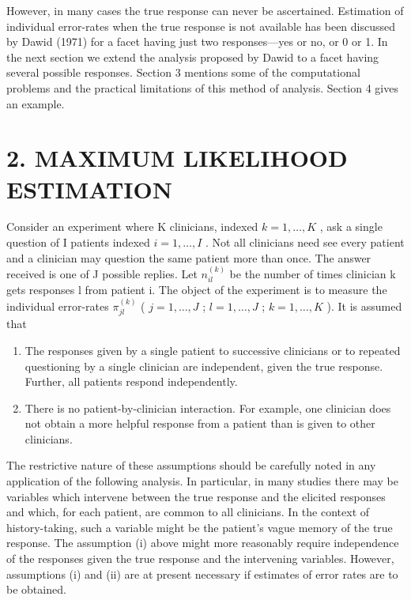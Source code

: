 \documentclass[
]{article}
\providecommand{\tightlist}{%
  \setlength{\itemsep}{0pt}\setlength{\parskip}{0pt}}
\begin{document}
However, in many cases the true response can never be ascertained.
Estimation of individual error-rates when the true response is not
available has been discussed by Dawid (1971) for a facet having just two
responses---yes or no, or 0 or 1. In the next section we extend the
analysis proposed by Dawid to a facet having several possible responses.
Section 3 mentions some of the computational problems and the practical
limitations of this method of analysis. Section 4 gives an example.

\section{2. MAXIMUM LIKELIHOOD
ESTIMATION}\label{maximum-likelihood-estimation}

Consider an experiment where K clinicians, indexed \(k = 1, \ldots, K\)
, ask a single question of I patients indexed \(i = 1, \ldots, I\) . Not
all clinicians need see every patient and a clinician may question the
same patient more than once. The answer received is one of J possible
replies. Let \(n_{il}^{(k)}\) be the number of times clinician k gets
responses l from patient i. The object of the experiment is to measure
the individual error-rates \(\pi_{jl}^{(k)}\) ( \(j = 1, \ldots, J\) ;
\(l = 1, \ldots, J\) ; \(k = 1, \ldots, K\) ). It is assumed that

\begin{enumerate}
\def\labelenumi{(\roman{enumi})}
\tightlist
\item
  The responses given by a single patient to successive clinicians or to
  repeated questioning by a single clinician are independent, given the
  true response. Further, all patients respond independently.\\
\item
  There is no patient-by-clinician interaction. For example, one
  clinician does not obtain a more helpful response from a patient than
  is given to other clinicians.
\end{enumerate}

The restrictive nature of these assumptions should be carefully noted in
any application of the following analysis. In particular, in many
studies there may be variables which intervene between the true response
and the elicited responses and which, for each patient, are common to
all clinicians. In the context of history-taking, such a variable might
be the patient's vague memory of the true response. The assumption (i)
above might more reasonably require independence of the responses given
the true response and the intervening variables. However, assumptions
(i) and (ii) are at present necessary if estimates of error rates are to
be obtained.
\end{document}

